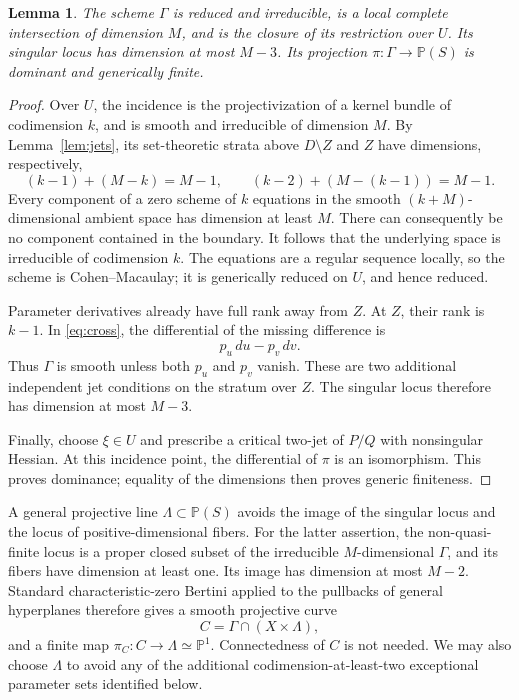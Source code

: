 \documentclass[11pt]{article}
\newtheorem{lemma}[theorem]{Lemma}
\newcommand{\PP}{\mathbb P}
\begin{document}
\begin{lemma}\label{lem:incidence}
The scheme $\Gamma$ is reduced and irreducible, is a local complete
intersection of dimension $M$, and is the closure of its restriction
over $U$. Its singular locus has dimension at most $M-3$.
Its projection $\pi:\Gamma\to\PP(S)$ is dominant and generically finite.
\end{lemma}
\begin{proof}
Over $U$, the incidence is the projectivization of a kernel bundle of
codimension $k$, and is smooth and irreducible of dimension $M$.
By Lemma~\ref{lem:jets}, its set-theoretic strata above
$D\setminus Z$ and $Z$ have dimensions, respectively,
\[
 (k-1)+(M-k)=M-1,\qquad
 (k-2)+(M-(k-1))=M-1.
\]
Every component of a zero scheme of $k$ equations in the smooth
$(k+M)$-dimensional ambient space has dimension at least $M$.
There can consequently be no component contained in the boundary.
It follows that the underlying space is irreducible of codimension
$k$. The equations are a regular sequence locally, so the scheme is
Cohen--Macaulay; it is generically reduced on $U$, and hence reduced.

Parameter derivatives already have full rank away from $Z$. At $Z$,
their rank is $k-1$. In \eqref{eq:cross}, the differential of the
missing difference is
\[
 p_u\,du-p_v\,dv.
\]
Thus $\Gamma$ is smooth unless both $p_u$ and $p_v$ vanish. These are
two additional independent jet conditions on the stratum over $Z$.
The singular locus therefore has dimension at most $M-3$.

Finally, choose $\xi\in U$ and prescribe a critical two-jet of $P/Q$
with nonsingular Hessian. At this incidence point, the differential
of $\pi$ is an isomorphism. This proves dominance; equality of the
dimensions then proves generic finiteness.
\end{proof}

A general projective line $\Lambda\subset\PP(S)$ avoids the image of
the singular locus and the locus of positive-dimensional fibers.
For the latter assertion, the non-quasi-finite locus is a proper
closed subset of the irreducible $M$-dimensional $\Gamma$, and its
fibers have dimension at least one. Its image has dimension at most
$M-2$. Standard characteristic-zero Bertini applied to the pullbacks
of general hyperplanes therefore gives a smooth projective curve
\[
 C=\Gamma\cap(X\times\Lambda),
\]
and a finite map $\pi_C:C\to\Lambda\simeq\PP^1$. Connectedness of $C$
is not needed. We may also choose $\Lambda$ to avoid any of the
additional codimension-at-least-two exceptional parameter sets
identified below.
\end{document}
